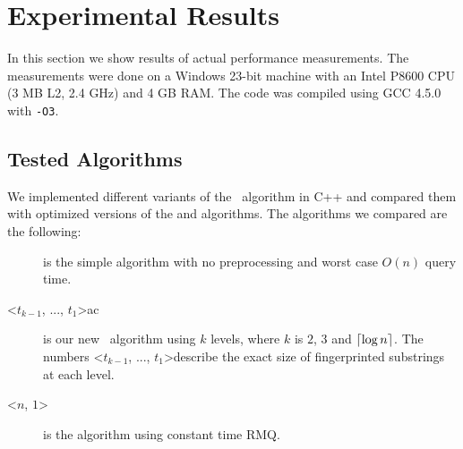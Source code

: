 \documentclass[a4]{article}
\begin{document}
\fi %

\section{Experimental Results\label{sec:results}}

In this section we show results of actual performance measurements. The measurements were done on a Windows 23-bit machine with an Intel P8600 CPU (3 MB L2, 2.4 GHz) and 4 GB RAM. The code was compiled using GCC 4.5.0 with \texttt{-O3}.

\subsection{Tested Algorithms}

\ifarticle

We implemented different variants of the \fprintk\ algorithm in C++ and compared them with optimized versions of the  and  algorithms. The algorithms we compared are the following:
\begin{description}
\item[] is the simple  algorithm with no preprocessing and worst case $O(n)$ query time.
\item[\fprintk\textless$t_{k-1}$, ..., $t_1$\textgreater ac] is our new \fprintk\ algorithm using $k$ levels, where $k$ is $2$, $3$ and $\lceil\log n\rceil$. The numbers \textless$t_{k-1}$, ..., $t_1$\textgreater describe the exact size of fingerprinted substrings at each level.
\item[\textless$n$, $1$\textgreater] is the  algorithm using constant time RMQ.
\end{description}

\fi %

\ifreport
\end{document}
